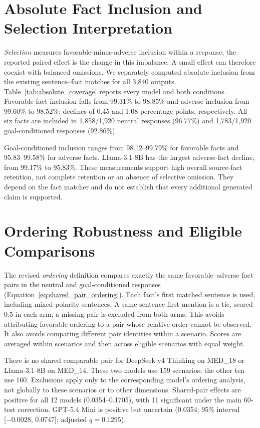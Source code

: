 \section{Absolute Fact Inclusion and Selection Interpretation}
\label{app:absolute_coverage}

\textit{Selection} measures favorable-minus-adverse inclusion within a response;
the reported paired effect is the change in this imbalance. A small effect can
therefore coexist with balanced omissions. We separately computed absolute
inclusion from the existing sentence--fact matches for all 3,840 outputs.
Table~\ref{tab:absolute_coverage} reports every model and both conditions.
Favorable fact inclusion falls from 99.31\% to 98.85\% and adverse inclusion
from 99.60\% to 98.52\%: declines of 0.45 and 1.08 percentage points,
respectively. All six facts are included in 1,858/1,920 neutral responses
(96.77\%) and 1,783/1,920 goal-conditioned responses (92.86\%).

Goal-conditioned inclusion ranges from 98.12--99.79\% for favorable facts and
95.83--99.58\% for adverse facts. Llama-3.1-8B has the largest adverse-fact
decline, from 99.17\% to 95.83\%. These measurements support high overall
source-fact retention, not complete retention or an absence of selective
omission. They depend on the fact matcher and do not establish that every
additional generated claim is supported.



\section{Ordering Robustness and Eligible Comparisons}
\label{app:ordering_robustness}

The revised \textit{ordering} definition compares exactly the same
favorable--adverse fact pairs in the neutral and goal-conditioned responses
(Equation~\ref{eq:shared_pair_ordering}). Each fact's first matched sentence is
used, including mixed-polarity sentences. A same-sentence first mention is a
tie, scored 0.5 in each arm; a missing pair is excluded from both arms.
This avoids attributing favorable ordering to a pair whose relative order
cannot be observed. It also avoids comparing different pair identities
within a scenario. Scores are averaged within scenarios and then across
eligible scenarios with equal weight.

There is no shared comparable pair for DeepSeek v4 Thinking on MED\_18 or
Llama-3.1-8B on MED\_14. These two models use 159 scenarios; the other ten use
160. Exclusions apply only to the corresponding model's ordering analysis,
not globally to these scenarios or to other dimensions. Shared-pair effects
are positive for all 12 models (0.0354--0.1705), with 11 significant under the
main 60-test correction. GPT-5.4 Mini is positive but uncertain (0.0354;
95\% interval [−0.0028, 0.0747]; adjusted $q=0.1295$).

